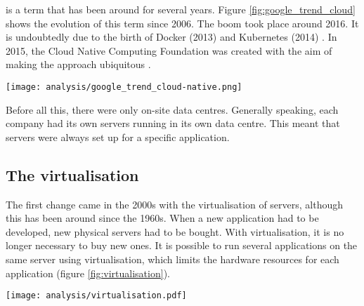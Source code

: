  is a term that has been around for several years. Figure \ref{fig:google_trend_cloud} shows the evolution of this term since 2006. The boom took place around 2016. It is undoubtedly due to the birth of Docker (2013) \cite{docker} and Kubernetes (2014) \cite{k8s}. In 2015, the Cloud Native Computing Foundation \cite{cncf} was created with the aim of making the  approach ubiquitous \cite{cncf_charter}.
\begin{center}
    \begingroup
    \texttt{[image: analysis/google\_trend\_cloud-native.png]}
    \label{fig:google_trend_cloud}
    \endgroup
\end{center}
Before all this, there were only on-site data centres. Generally speaking, each company had its own servers running in its own data centre. This meant that servers were always set up for a specific application. \cite{history_cloud_native}

\subsection{The virtualisation}
The first change came in the 2000s with the virtualisation of servers, although this has been around since the 1960s. When a new application had to be developed, new physical servers had to be bought. With virtualisation, it is no longer necessary to buy new ones. It is possible to run several applications on the same server using virtualisation, which limits the hardware resources for each application (figure \ref{fig:virtualisation}). \cite{history_cloud_native}
\begin{center}
    \begingroup
    \texttt{[image: analysis/virtualisation.pdf]}
    \label{fig:virtualisation}
    \endgroup
\end{center}

